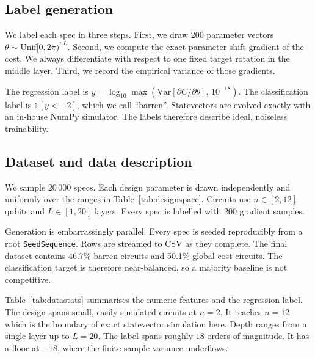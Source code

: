 \documentclass[12pt]{iopart}
\newcommand{\Nrows}{20\,000}
\newcommand{\Nspecs}{20\,000}
\newcommand{\Samples}{200}
\newcommand{\QubitLo}{2}
\newcommand{\QubitHi}{12}
\newcommand{\LayerLo}{1}
\newcommand{\LayerHi}{20}
\newcommand{\GlobalFrac}{50.1}
\newcommand{\BarrenFrac}{46.7}
\begin{document}
\subsection{Label generation}
We label each spec in three steps. First, we draw \Samples{} parameter vectors
$\theta\sim\mathrm{Unif}[0,2\pi)^{nL}$. Second, we compute the exact
parameter-shift gradient of the cost. We always differentiate with respect to one
fixed target rotation in the middle layer. Third, we record the empirical
variance of those gradients.

The regression label is
$y=\log_{10}\max(\mathrm{Var}[\partial C/\partial\theta],\,10^{-18})$. The
classification label is $\mathbb{1}[y<-2]$, which we call ``barren''.
Statevectors are evolved exactly with an in-house NumPy simulator. The labels
therefore describe ideal, noiseless trainability.

\subsection{Dataset and data description}
We sample \Nspecs{} specs. Each design parameter is drawn independently and
uniformly over the ranges in Table~\ref{tab:designspace}. Circuits use
$n\in[\QubitLo,\QubitHi]$ qubits and $L\in[\LayerLo,\LayerHi]$ layers. Every spec
is labelled with \Samples{} gradient samples.

Generation is embarrassingly parallel. Every spec is seeded reproducibly from a
root \verb|SeedSequence|. Rows are streamed to CSV as they complete. The final
dataset contains \BarrenFrac{}\% barren circuits and \GlobalFrac{}\% global-cost
circuits. The classification target is therefore near-balanced, so a majority
baseline is not competitive.

\begin{table}[t]
\caption{Sampled design space. Each spec draws these parameters independently and
uniformly.}
\label{tab:designspace}
\centering

\end{table}

Table~\ref{tab:datastats} summarises the numeric features and the regression
label. The design spans small, easily simulated circuits at $n=2$. It reaches
$n=12$, which is the boundary of exact statevector simulation here. Depth ranges
from a single layer up to $L=20$. The label spans roughly $18$ orders of
magnitude. It has a floor at $-18$, where the finite-sample variance underflows.

\begin{table}[t]
\caption{Descriptive statistics of the numeric features and the trainability
label over all \Nrows{} circuits.}
\label{tab:datastats}
\centering

\end{table}
\end{document}
